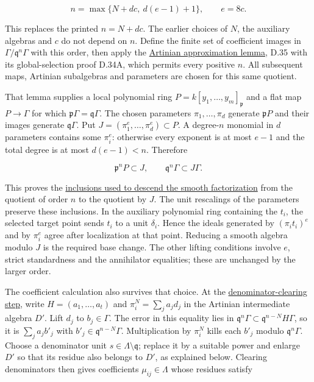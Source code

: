 \documentclass[11pt,a4paper,openany]{report}
\begin{document}
\[
n=\max\{N+dc,\ d(e-1)+1\},\qquad e=8c.
\]

This replaces the printed \(n=N+dc\). The earlier choices of \(N\), the auxiliary algebras and \(c\) do not depend on \(n\). Define the finite set of coefficient images in \(\Gamma/\mathfrak q^n\Gamma\) with this order, then apply the \href{https://github.com/KokunoYumeto/open-math-courses/blob/main/docs/courses/AG-RG/AG-RG-S05.md}{Artinian approximation lemma}, D.35 with its global-selection proof D.34A, which permits every positive \(n\). All subsequent maps, Artinian subalgebras and parameters are chosen for this same quotient.

That lemma supplies a local polynomial ring \(P=k[y_1,\ldots,y_m]_{\mathfrak p}\) and a flat map \(P\to\Gamma\) for which \(\mathfrak p\Gamma=\mathfrak q\Gamma\). The chosen parameters \(\pi_1,\ldots,\pi_d\) generate \(\mathfrak pP\) and their images generate \(\mathfrak q\Gamma\). Put \(J=(\pi_1^e,\ldots,\pi_d^e)\subset P\). A degree-\(n\) monomial in \(d\) parameters contains some \(\pi_i^e\): otherwise every exponent is at most \(e-1\) and the total degree is at most \(d(e-1)<n\). Therefore

\[
\mathfrak p^nP\subset J,\qquad
\mathfrak q^n\Gamma\subset J\Gamma.
\]

This proves the \href{https://github.com/KokunoYumeto/unofficial-stacks-project-ai-drafts/blob/565b10e987aba5969b21145a0833f42d69f96790/smoothing.tex\#L3033-L3056}{inclusions used to descend the smooth factorization} from the quotient of order \(n\) to the quotient by \(J\). The unit rescalings of the parameters preserve these inclusions. In the auxiliary polynomial ring containing the \(t_i\), the selected target point sends \(t_i\) to a unit \(\delta_i\). Hence the ideals generated by \((\pi_i t_i)^e\) and by \(\pi_i^e\) agree after localization at that point. Reducing a smooth algebra modulo \(J\) is the required base change. The other lifting conditions involve \(e\), strict standardness and the annihilator equalities; these are unchanged by the larger order.

The coefficient calculation also survives that choice. At the \href{https://github.com/KokunoYumeto/unofficial-stacks-project-ai-drafts/blob/565b10e987aba5969b21145a0833f42d69f96790/smoothing.tex\#L2935-L2993}{denominator-clearing step}, write \(H=(a_1,\ldots,a_t)\) and \(\pi_i^N=\sum_j a_jd_j\) in the Artinian intermediate algebra \(D'\). Lift \(d_j\) to \(b_j\in\Gamma\). The error in this equality lies in \(\mathfrak q^n\Gamma\subset\mathfrak q^{n-N}H\Gamma\), so it is \(\sum_j a_jb'_j\) with \(b'_j\in\mathfrak q^{n-N}\Gamma\). Multiplication by \(\pi_i^N\) kills each \(b'_j\) modulo \(\mathfrak q^n\Gamma\). Choose a denominator unit \(s\in\Lambda\setminus\mathfrak q\); replace it by a suitable power and enlarge \(D'\) so that its residue also belongs to \(D'\), as explained below. Clearing denominators then gives coefficients \(\mu_{ij}\in\Lambda\) whose residues satisfy
\end{document}

